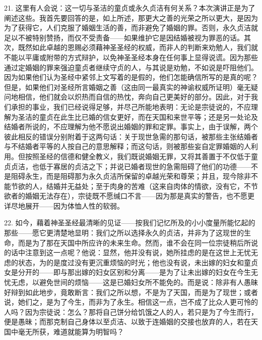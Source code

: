 21. 这里有人会说：这一切与圣洁的童贞或永久贞洁有何关系？本次演讲正是为了阐述这些。我首先要回答的是，如上所述，那更大之善的光荣之所以更大，是因为为了获得它，人们克服了婚姻生活的善，而非避免了婚姻的罪。否则，永久贞洁就足以不被特别赞扬，而仅不受责备——如果维护它是因结婚被视为罪恶的话。其次，既然如此卓越的恩赐必须藉神圣圣经的权威，而非人的判断来劝勉人，我们就不能以平庸或附带的方式辩护，以免神圣圣经本身在任何事上显得说谎。因为那些通过定婚姻的罪来强迫童贞者继续守贞的人，与其说是劝勉，不如说是吓阻他们。因为如果他们认为圣经中紧邻上文写着的是假的，他们怎能确信所写的是真的呢？但是，如果他们对圣经所言婚姻之善（这由同一最真实的神谕权威所证明）毫无疑问地相信，他们就会以炽热而自信的热忱，奔向自己更美好的部分。因此，对于我们承担的事业，我们已经说得足够，并尽己所能地表明：无论是宗徒说的，不应理解为圣洁的童贞在此生比已婚的信女更好，而在天国和来世平等；还是另一处论及结婚者所说的，不应理解为他不愿说出婚姻的罪和定罪。事实上，由于误解，两个彼此相反的错误分别附着于这两句话：关于现世急需的那句话，被那些主张结婚者与不结婚者平等的人按自己的意思解释；而这句话，则被那些妄自定罪婚姻的人利用。但按照圣经的信德和健全教义，我们既说婚姻无罪，又将其善置于不仅低于童贞贞洁，也低于寡居的贞洁之下；并说已婚者现世的急需阻碍了他们的功德——不是阻碍永生，而是阻碍那为永久贞洁所保留的卓越光荣和尊荣；并且，现今除非不能节欲的人，结婚并无益处；至于肉身的苦难（这来自肉体的情欲，没有它，不节欲者的婚姻无法存在），宗徒既不愿缄口不言——因为那是真实的警告，也不愿更详尽地展开——因为体恤人性的软弱。\par

22. 如今，藉着神圣圣经最清晰的见证——按我们记忆所及的小小度量所能忆起的那些——愿它更清楚地显明：我们之所以选择永久的贞洁，并非为了这现世的生命，而是为了那在天国中所应许的未来生命。然而，谁不会在同一位宗徒稍后所说的话中注意到这一点呢？他说：显然，他并没有说，她所挂虑的是在这世上无忧无虑的状态，为的是度过没有更沉重烦恼的时光；他也没有说，未出嫁的妇女和童贞女是分开的——即与那出嫁的妇女区别和分离——是为了让未出嫁的妇女在今生无忧无虑，以避免世间的烦恼——这是已婚妇女所不能免的。而是说：除非有人愚昧好辩到如此地步，竟敢断言：我们之所以想，不是为了天国，而是为了现世；或者说，她们之，是为了今生，而非为了永生。相信这一点，岂不成了比众人更可怜的人吗？因为宗徒说：怎么？那将自己饼分给饥饿之人的人，若只是为了今生而行，便是愚昧；而那克制自己身体以至贞洁、以致于连婚姻的交接也放弃的人，若在天国中毫无所获，难道就能算为明智吗？\par

